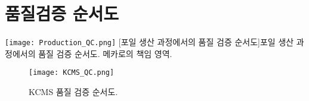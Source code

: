 \section{품질검증 순서도}

\mbox{} \begin{center}
  \begin{sideways}
    \begin{minipage}{1.3\linewidth}
      \texttt{[image: Production\_QC.png]}
      [포일 생산 과정에서의 품질 검증 순서도]{포일 생산 과정에서의 품질 검증 순서도. 메카로의 책임 영역.}
      \label{fig:production_qc_flow_chart}
    \end{minipage}
  \end{sideways}
\end{center}

\begin{sidewaysfigure}
  \centering
  \texttt{[image: KCMS\_QC.png]}
  \caption[KCMS 품질 검증 순서도]{KCMS 품질 검증 순서도.}
  \label{fig:kcms_qc_flow_chart}
\end{sidewaysfigure}
